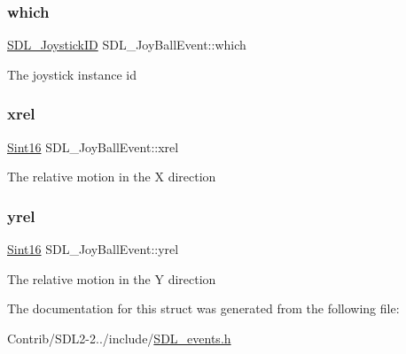 \subsubsection{\texorpdfstring{which}{which}}
{\footnotesize\ttfamily \mbox{\hyperlink{_s_d_l__joystick_8h_a3c3d32500cb08f76ee8077983912c0bd}{S\+D\+L\+\_\+\+Joystick\+ID}} S\+D\+L\+\_\+\+Joy\+Ball\+Event\+::which}

The joystick instance id \mbox{\label{struct_s_d_l___joy_ball_event_a959a8473aa1964e5e1778c27a9ffd261}} 
\subsubsection{\texorpdfstring{xrel}{xrel}}
{\footnotesize\ttfamily \mbox{\hyperlink{_s_d_l__stdinc_8h_a9d0257032c0e146ab6121bf0122712f5}{Sint16}} S\+D\+L\+\_\+\+Joy\+Ball\+Event\+::xrel}

The relative motion in the X direction \mbox{\label{struct_s_d_l___joy_ball_event_a28ad48a9eb7a5d3ff62ccba09fcead76}} 
\subsubsection{\texorpdfstring{yrel}{yrel}}
{\footnotesize\ttfamily \mbox{\hyperlink{_s_d_l__stdinc_8h_a9d0257032c0e146ab6121bf0122712f5}{Sint16}} S\+D\+L\+\_\+\+Joy\+Ball\+Event\+::yrel}

The relative motion in the Y direction 

The documentation for this struct was generated from the following file\+:\begin{DoxyCompactItemize}
\item 
Contrib/\+S\+D\+L2-\/2../include/\mbox{\hyperlink{_s_d_l__events_8h}{S\+D\+L\+\_\+events.\+h}}\end{DoxyCompactItemize}
